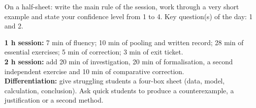 \begin{exitticket}[3 minutes]On a half-sheet: write the main rule of the session, work through a very short example and state your confidence level from 1 to 4. Key question(s) of the day: 1 and 2.\end{exitticket}

\ifmxteacher
\begin{method}
\textbf{1 h session:} 7 min of fluency; 10 min of pooling and written record; 28 min of essential exercises; 5 min of correction; 3 min of exit ticket.\\
\textbf{2 h session:} add 20 min of investigation, 20 min of formalisation, a second independent exercise and 10 min of comparative correction.\\
\textbf{Differentiation:} give struggling students a four-box sheet (data, model, calculation, conclusion). Ask quick students to produce a counterexample, a justification or a second method.
\end{method}
\fi
